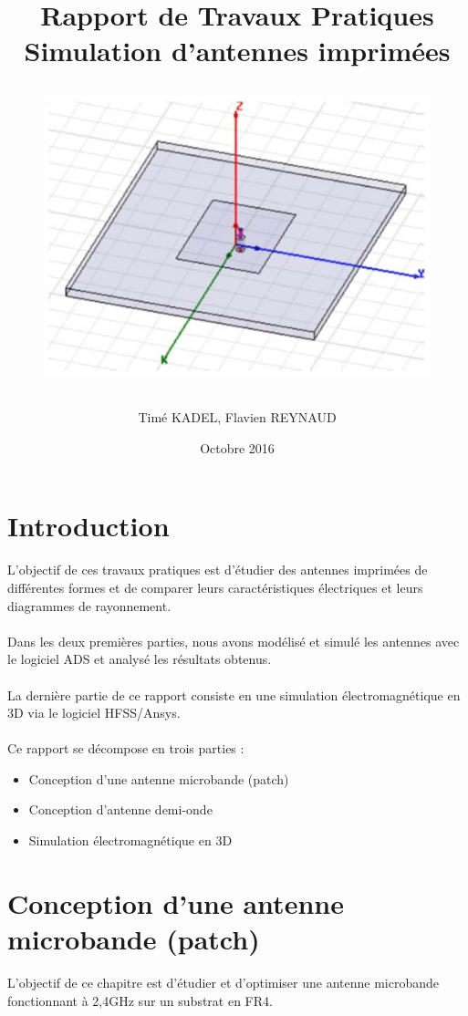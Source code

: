 \documentclass[16pt,a4paper,oneside,titlepage]{report}
\author{Timé KADEL, Flavien REYNAUD}
\title{
 \textbf{Rapport de Travaux Pratiques}\\
 Simulation d'antennes imprimées\\
 \begin{figure}[h]
\center
\includegraphics[scale=0.4]{Images/Titre.png}
\end{figure}
 }
\date{Octobre 2016}
\begin{document}
\maketitle 
\tableofcontents
\listoffigures

\chapter{Introduction}

L'objectif de ces travaux pratiques est d'étudier des antennes imprimées de différentes formes et de comparer leurs caractéristiques électriques et leurs diagrammes de rayonnement.\\\\
Dans les deux premières parties, nous avons modélisé et simulé les antennes avec le logiciel ADS et analysé les résultats obtenus.\\\\
La dernière partie de ce rapport consiste en une simulation électromagnétique en 3D via le logiciel HFSS/Ansys.\\\\
Ce rapport se décompose en trois parties : 
\begin{itemize}
\item Conception d'une antenne microbande (patch)
\item Conception d'antenne demi-onde
\item Simulation électromagnétique en 3D
\end{itemize}

\chapter{Conception d'une antenne microbande (patch)}

L'objectif de ce chapitre est d'étudier et d'optimiser une antenne microbande fonctionnant à 2,4GHz sur un substrat en FR4.\\\\
\end{document}

